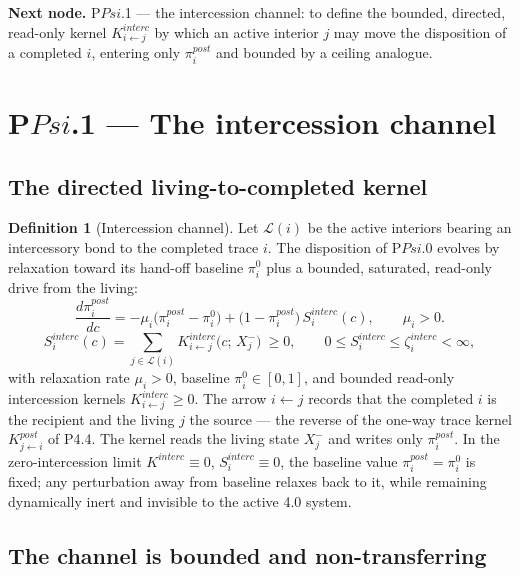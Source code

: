 \documentclass[11pt,a4paper]{article}
\newcommand{\cint}{\ensuremath{\mathfrak c}}
\def\Psi{Psi}%
\def\mathfrak#1{#1}%
\def\mathrm#1{#1}%
\def\emph#1{#1}%
\theoremstyle{definition}
\newtheorem{definition}{Definition}[section]
\theoremstyle{plain}
\theoremstyle{remark}
\begin{document}
\medskip
\textbf{Next node.} P$\Psi$.1 --- the intercession channel: to define the bounded, directed,
read-only kernel \(K^{\mathrm{interc}}_{i\leftarrow j}\) by which an active interior \(j\) may
move the disposition of a completed \(i\), entering only \(\pi_i^{\mathrm{post}}\) and bounded
by a ceiling analogue.

\section{P$\Psi$.1 --- The intercession channel}

\subsection{The directed living-to-completed kernel}

\begin{definition}[Intercession channel]\label{def:intercession}
Let \(\mathcal L(i)\) be the active interiors bearing an intercessory bond to the completed
trace \(i\). The disposition of P$\Psi$.0 evolves by relaxation toward its hand-off baseline
\(\pi_i^{0}\) plus a bounded, saturated, read-only drive from the living:
\[
\boxed{\;
\frac{d\pi_i^{\mathrm{post}}}{d\cint}
=
-\mu_i\bigl(\pi_i^{\mathrm{post}}-\pi_i^{0}\bigr)
+
\bigl(1-\pi_i^{\mathrm{post}}\bigr)\,S_i^{\mathrm{interc}}(\cint),
\qquad
\mu_i>0.
\;}
\]
\[
S_i^{\mathrm{interc}}(\cint)
=
\sum_{j\in\mathcal L(i)}
K^{\mathrm{interc}}_{i\leftarrow j}\bigl(\cint;\,X_j^{-}\bigr)\ \ge 0,
\qquad
0\le S_i^{\mathrm{interc}}\le \zeta_i^{\mathrm{interc}}<\infty,
\]
with relaxation rate \(\mu_i>0\), baseline \(\pi_i^{0}\in[0,1]\), and bounded read-only
intercession kernels \(K^{\mathrm{interc}}_{i\leftarrow j}\ge0\). The arrow \(i\leftarrow j\)
records that the completed \(i\) is the recipient and the living \(j\) the source --- the
reverse of the one-way trace kernel \(K^{\mathrm{post}}_{j\leftarrow i}\) of P4.4. The kernel
\emph{reads} the living state \(X_j^{-}\) and \emph{writes} only \(\pi_i^{\mathrm{post}}\).
In the zero-intercession limit \(K^{\mathrm{interc}}\equiv0\), \(S_i^{\mathrm{interc}}\equiv0\),
the baseline value \(\pi_i^{\mathrm{post}}=\pi_i^0\) is fixed; any perturbation away from
baseline relaxes back to it, while remaining dynamically inert and invisible to the active 4.0
system.
\end{definition}

\subsection{The channel is bounded and non-transferring}
\end{document}
